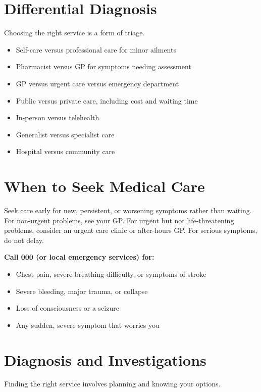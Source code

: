 \section*{Differential Diagnosis}
Choosing the right service is a form of triage.

\begin{itemize}
    \item Self-care versus professional care for minor ailments
    \item Pharmacist versus GP for symptoms needing assessment
    \item GP versus urgent care versus emergency department
    \item Public versus private care, including cost and waiting time
    \item In-person versus telehealth
    \item Generalist versus specialist care
    \item Hospital versus community care
\end{itemize}

\section*{When to Seek Medical Care}
Seek care early for new, persistent, or worsening symptoms rather than waiting. For non-urgent problems, see your GP. For urgent but not life-threatening problems, consider an urgent care clinic or after-hours GP. For serious symptoms, do not delay.

\textbf{Call 000 (or local emergency services) for:}
\begin{itemize}
    \item Chest pain, severe breathing difficulty, or symptoms of stroke
    \item Severe bleeding, major trauma, or collapse
    \item Loss of consciousness or a seizure
    \item Any sudden, severe symptom that worries you
\end{itemize}

\section*{Diagnosis and Investigations}
Finding the right service involves planning and knowing your options.

